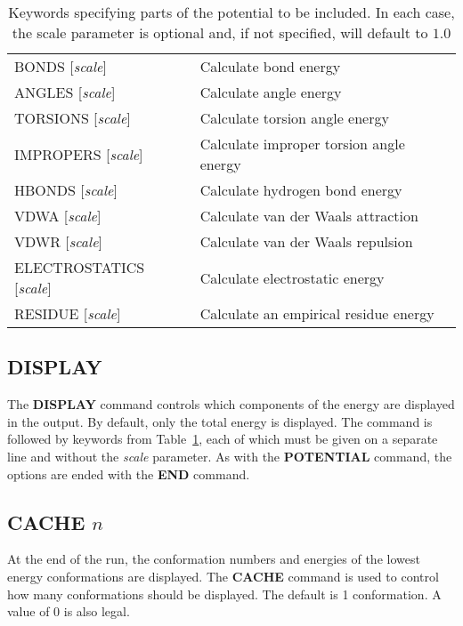 \documentclass[12pt]{article}
\begin{document}
\begin{table}[h]
\begin{center}
\begin{tabular}{ll}
BONDS [{\em scale}]          & Calculate bond energy                  \\
ANGLES [{\em scale}]         & Calculate angle energy                 \\
TORSIONS [{\em scale}]       & Calculate torsion angle energy         \\
IMPROPERS [{\em scale}]      & Calculate improper torsion angle energy\\
HBONDS [{\em scale}]         & Calculate hydrogen bond energy         \\
VDWA [{\em scale}]           & Calculate van der Waals attraction     \\
VDWR [{\em scale}]           & Calculate van der Waals repulsion      \\
ELECTROSTATICS [{\em scale}] & Calculate electrostatic energy         \\
RESIDUE [{\em scale}]        & Calculate an empirical residue energy  \\
\end{tabular}
\end{center}
\caption{\label{tab:pot} Keywords specifying parts of the potential to
be included. In each case, the scale parameter is optional and, if not
specified, will default to $1.0$}
\end{table}

\subsection{DISPLAY}
The {\bf DISPLAY} command controls which components of the energy are
displayed in the output. By default, only the total energy is
displayed. The command is followed by keywords from
Table~\ref{tab:pot}, each of which must be given on a separate line
and without the {\em scale\/} parameter.
As with the {\bf POTENTIAL} command, the options are ended with the
{\bf END} command.

\subsection{CACHE $n$}
At the end of the run, the conformation numbers and energies of the
lowest energy conformations are displayed. The {\bf CACHE} command is
used to control how many conformations should be displayed. The
default is 1 conformation. A value of 0 is also legal.
\end{document}
